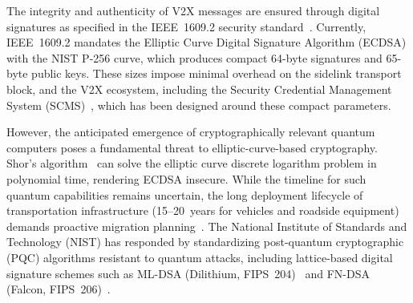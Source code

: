 \documentclass[letterpaper,journal]{IEEEtran}
\begin{document}
The integrity and authenticity of V2X messages are ensured through digital signatures as specified in the IEEE~1609.2 security standard~\cite{ieee_16092}. Currently, IEEE~1609.2 mandates the Elliptic Curve Digital Signature Algorithm (ECDSA) with the NIST P-256 curve, which produces compact 64-byte signatures and 65-byte public keys. These sizes impose minimal overhead on the sidelink transport block, and the V2X ecosystem, including the Security Credential Management System (SCMS)~\cite{brecht2018scms}, which has been designed around these compact parameters.

However, the anticipated emergence of cryptographically relevant quantum computers poses a fundamental threat to elliptic-curve-based cryptography. Shor's algorithm~\cite{shor1994algorithms} can solve the elliptic curve discrete logarithm problem in polynomial time, rendering ECDSA insecure. While the timeline for such quantum capabilities remains uncertain, the long deployment lifecycle of transportation infrastructure (15--20~years for vehicles and roadside equipment) demands proactive migration planning~\cite{campagna2020pqc_migration}. The National Institute of Standards and Technology (NIST) has responded by standardizing post-quantum cryptographic (PQC) algorithms resistant to quantum attacks, including lattice-based digital signature schemes such as ML-DSA (Dilithium, FIPS~204)~\cite{fips204} and FN-DSA (Falcon, FIPS~206)~\cite{fips206}.
\end{document}
